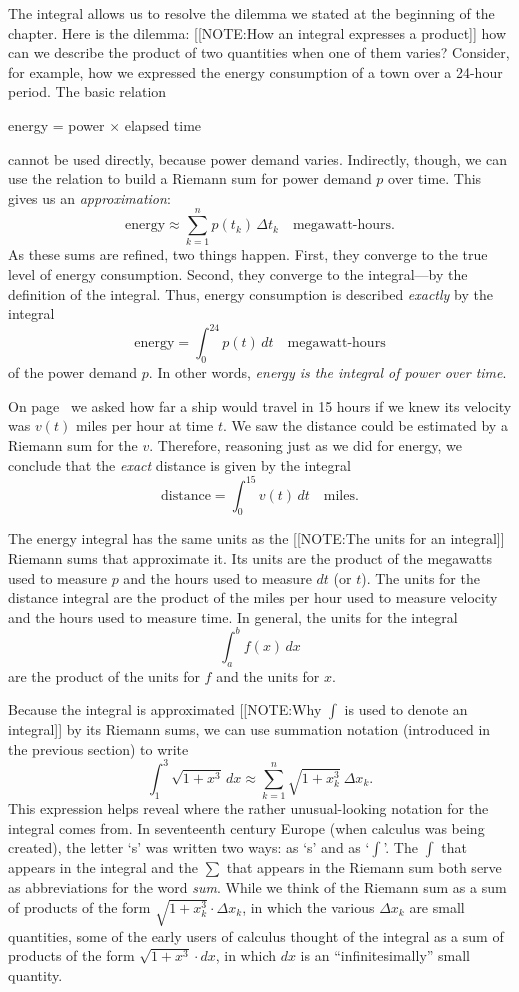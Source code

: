 	The integral allows us to resolve the dilemma we stated at the beginning of the chapter.  Here is the dilemma: 
	[[NOTE:How an integral expresses a product]]
how can we describe the product of two quantities when one of them varies?  Consider, for example, how we expressed the energy consumption of a town over a 24-hour period.  The basic relation
	\begin{center}
	energy = power $\times$ elapsed time
	\end{center}
cannot be used directly, because power demand varies.  Indirectly, though, we can use the relation to build a Riemann sum for power demand $p$ over time.  This gives us an {\em approximation\/}:
	\[
\mbox{energy} \approx 
		\sum_{k = 1}^n p(t_k)\, \Delta t_k 
		\quad \mbox{megawatt-hours}.
\]
As these sums are refined, two things happen.  First, they converge to the true level of energy consumption.  Second, they converge to the integral---by the definition of the integral.  Thus, energy consumption is described {\em exactly\/} by the integral
	\[
\mbox{energy} = \int_0^{24} p(t)\, dt 
		\quad \mbox{megawatt-hours}
\]
of the power demand $p$.  In other words, {\em energy is the integral of power over time}.  

On page~\pageref{ship} we asked how far a ship would travel in
15 hours if we knew its velocity was $v(t)$ miles per hour at time
$t$.  We saw the distance could be estimated by a Riemann sum for the
$v$.  Therefore, reasoning just as we did for energy, we conclude that
the {\em exact\/} distance is given by the integral
	\[
\mbox{distance} = \int_0^{15} v(t)\,dt 
		\quad \mbox{miles}.
\]


	The energy integral has the same units as the 
	[[NOTE:The units for  an integral]]
Riemann sums that approximate it.  Its units are the product of the megawatts used to measure $p$ and the hours used to measure $dt$ (or $t$).  The units for the distance integral are the product of the miles per hour used to measure velocity and the hours used to measure time.  In general, the units for the integral
	\[
\int_a^b f(x) \, dx
\]
are the product of the units for $f$ and the units for $x$.

	Because the integral is approximated 
	[[NOTE:Why $\int$ is used  to denote an integral]]
by its Riemann sums, we can use summation notation (introduced in the previous section) to write
	\[
\int_1^3 \sqrt{1+x^3} \, dx \approx
		\sum_{k=1}^n \sqrt{1+x_k^3}\: \Delta x_k.
\]
This expression helps reveal where the rather unusual-looking notation for the integral comes from.  In seventeenth century Europe (when calculus was being created), the letter `s' was written two ways: as 
`s' and as `$\int$'.  The $\int$ that appears in the integral and the $\sum$ that appears in the Riemann sum both serve as abbreviations for the word {\em sum}.  While we think of the Riemann sum as a sum of products of the form $\sqrt{1+x_k^3}\cdot\Delta x_k$, in which the various $\Delta x_k$ are small quantities, some of the early users of calculus thought of the integral as a sum of products of the form $\sqrt{1+x^3}\cdot dx$, in which $dx$ is an ``infinitesimally'' small quantity.

